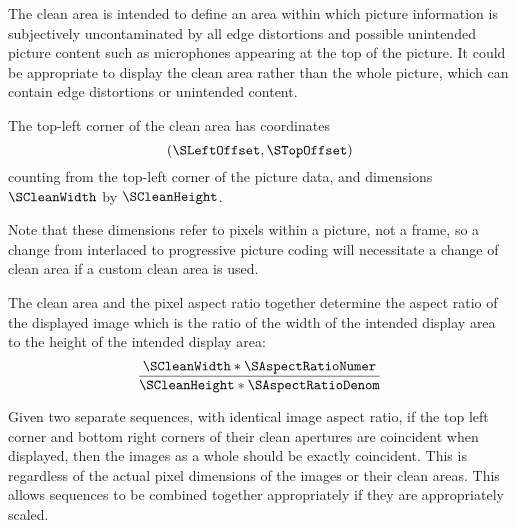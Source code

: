 \begin{informative*}
The clean area is intended to define an area within which picture information is
 subjectively uncontaminated by all edge distortions and possible unintended
 picture content such as microphones appearing at the top of the picture. It
could be appropriate to display the clean area rather than the whole picture,
 which can contain edge distortions or unintended content.

The top-left corner of the clean area has coordinates
\[(\SLeftOffset,\STopOffset)\]
counting from the top-left corner of the picture data, and
dimensions $\SCleanWidth$ by $\SCleanHeight$.

Note that these dimensions refer to pixels within a picture, not a frame,
so a change from interlaced to progressive picture coding will
necessitate a change of clean area if a custom clean area is used.

The clean area and the pixel aspect ratio together determine the
aspect ratio of the displayed image which is the ratio of the width of the
 intended
display area to the height of the intended display area:
\[\dfrac{\SCleanWidth*\SAspectRatioNumer}{\SCleanHeight*\SAspectRatioDenom}\]

Given two separate sequences, with identical image aspect ratio, if the
top left corner and bottom right corners of their clean apertures are
coincident when displayed, then the images as a whole should be exactly
coincident. This is regardless of the actual pixel dimensions of the
images or their clean areas. This allows sequences to be combined
together appropriately if they are appropriately scaled.

\end{informative*}
